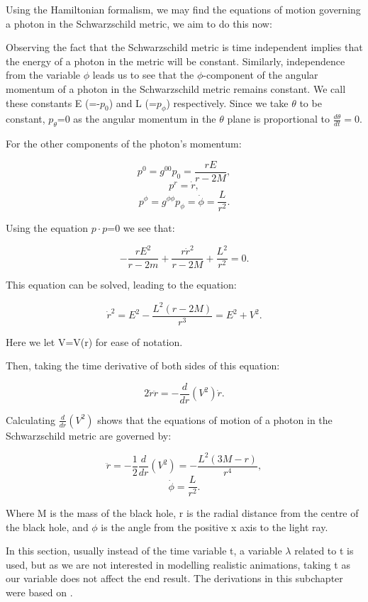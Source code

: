 \documentclass[oneside,openright,frontopenright, singlespacing]{dmathesis}
\begin{document}
	Using the Hamiltonian formalism, we may find the equations of motion governing a photon in the Schwarzschild metric, we aim to do this now:

	Observing the fact that the Schwarzschild metric is time independent implies that the energy of a photon in the metric will be constant. Similarly, independence from the variable $\phi$ leads us to see that the $\phi$-component of the angular momentum of a photon in the Schwarzschild metric remains constant. We call these constants E (=-$p_0$) and L (=$p_\phi$) respectively. Since we take ${\theta}$ to be constant, $p_\theta$=0 as the angular momentum in the $\theta$ plane is proportional to $\frac{d\theta}{dt}=0$.

\vspace{1em}
	For the other components of the photon's momentum:

	\[p^0 = g^{00}p_0 = \frac{rE}{r-2M},\]
	\[p^r = \dot{r},\]
	\[p^\phi = g^{\phi\phi}p_\phi = \dot{\phi} = \frac{L}{r^2}.\]

\vspace{1em}
	Using the equation $p \cdot p$=0 we see that:

	\[-\frac{rE^2}{r-2m}+\frac{r\dot{r}^2}{r-2M}+\frac{L^2}{r^2}=0.\]

\vspace{1em}
	This equation can be solved, leading to the equation:

	\[\dot{r}^2 = E^2-\frac{L^2(r-2M)}{r^3} = E^2 + V^2.\]

\vspace{1em}
	Here we let V=V(r) for ease of notation.

\vspace{1em}
	Then, taking the time derivative of both sides of this equation:

	\[2\dot{r}\ddot{r} = -\frac{d}{dr}(V^2)\dot{r}.\]

\vspace{1em}
	Calculating $\frac{d}{dr}(V^2)$ shows that the equations of motion of a photon in the Schwarzschild metric are governed by:

	\[\ddot{r} = -\frac{1}{2}\frac{d}{dr}(V^2) = -\frac{L^2(3M-r)}{r^4},\]
	\[\dot{\phi}=\frac{L}{r^2}.\]

\vspace{1em}
	Where M is the mass of the black hole, r is the radial distance from the centre of the black hole, and $\phi$ is the angle from the positive x axis to the light ray.

\vspace{1em}
	In this section, usually instead of the time variable t, a variable $\lambda$ related to t is used, but as we are not interested in modelling realistic animations, taking t as our variable does not affect the end result. The derivations in this subchapter were based on \cite[pg. 283-285]{schutz2009first}.
\end{document}

